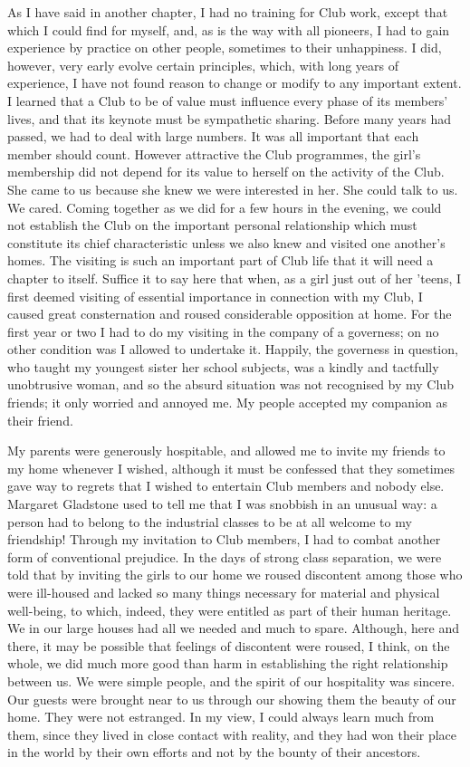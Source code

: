 As I have said in another chapter, I had no training
for Club work, except that which I could find for
myself, and, as is the way with all pioneers, I had to gain
experience by practice on other people, sometimes to their
unhappiness. I did, however, very early evolve certain
principles, which, with long years of experience, I have
not found reason to change or modify to any important
extent. I learned that a Club to be of value must influence
every phase of its members’ lives, and that its keynote
must be sympathetic sharing. Before many years had
passed, we had to deal with large numbers. It was all
important that each member should count. However
attractive the Club programmes, the girl’s membership
did not depend for its value to herself on the activity
of the Club. She came to us because she knew we were
interested in her. She could talk to us. We cared.
Coming together as we did for a few hours in the evening,
we could not establish the Club on the important personal
relationship which must constitute its chief characteristic
unless we also knew and visited one another’s homes. The
visiting is such an important part of Club life that it will
need a chapter to itself. Suffice it to say here that when,
as a girl just out of her ’teens, I first deemed visiting of
essential importance in connection with my Club, I caused
great consternation and roused considerable opposition at
home. For the first year or two I had to do my visiting
in the company of a governess; on no other condition was
I allowed to undertake it. Happily, the governess in
question, who taught my youngest sister her school subjects,
was a kindly and tactfully unobtrusive woman, and
so the absurd situation was not recognised by my Club
friends; it only worried and annoyed me. My people
accepted my companion as their friend.

My parents were generously hospitable, and allowed
me to invite my friends to my home whenever I wished,
although it must be confessed that they sometimes gave
way to regrets that I wished to entertain Club members
and nobody else. Margaret Gladstone used to tell me
that I was snobbish in an unusual way: a person had to
belong to the industrial classes to be at all welcome to
my friendship! Through my invitation to Club members,
I had to combat another form of conventional
prejudice. In the days of strong class separation, we were
told that by inviting the girls to our home we roused
discontent among those who were ill-housed and lacked so
many things necessary for material and physical
well-being, to which, indeed, they were entitled as part of
their human heritage. We in our large houses had all
we needed and much to spare. Although, here and there,
it may be possible that feelings of discontent were roused,
I think, on the whole, we did much more good than harm
in establishing the right relationship between us. We
were simple people, and the spirit of our hospitality was
sincere. Our guests were brought near to us through our
showing them the beauty of our home. They were not
estranged. In my view, I could always learn much from
them, since they lived in close contact with reality, and
they had won their place in the world by their own efforts
and not by the bounty of their ancestors.


